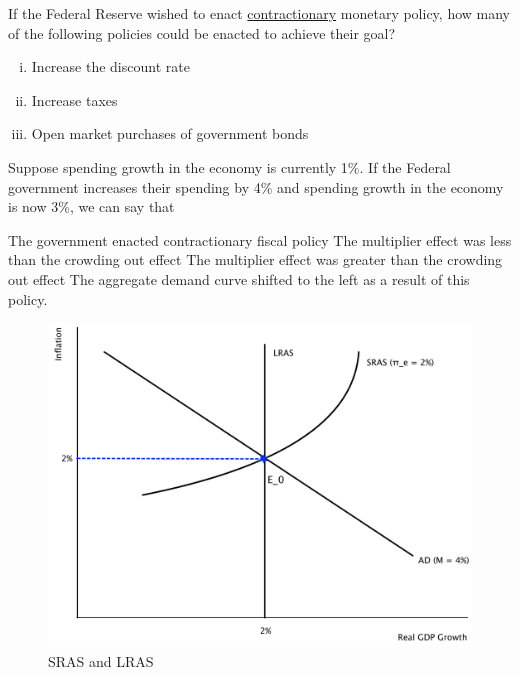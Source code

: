 \documentclass[addpoints,11pt]{exam}
\theoremstyle{definition}
\begin{document}
\begin{questions}
\question If the Federal Reserve wished to enact \underline{contractionary} monetary policy, how many of the following policies could be enacted to achieve their goal?

\begin{enumerate}[i.]
	\item Increase the discount rate
	\item Increase taxes
	\item Open market purchases of government bonds
\end{enumerate}

\begin{choices}
\end{choices}

\question Suppose spending growth in the economy is currently 1\%. If the Federal government increases their spending by 4\% and spending growth in the economy is now 3\%, we can say that

\begin{choices}
	\choice The government enacted contractionary fiscal policy
	\CorrectChoice The multiplier effect was less than the crowding out effect
	\choice The multiplier effect was greater than the crowding out effect
	\choice The aggregate demand curve shifted to the left as a result of this policy.
\end{choices} 


\begin{figure}[H]
	\centering
	\includegraphics[scale=.40]{hw6_plot1.pdf}
	\caption{SRAS and LRAS}
	\label{mc40}
\end{figure}


\end{questions}
\end{document}
